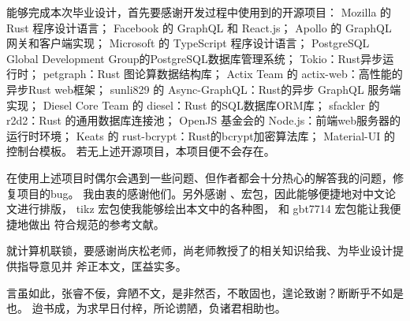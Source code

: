 \begin{arigatou}
    能够完成本次毕业设计，首先要感谢开发过程中使用到的开源项目：
    Mozilla 的 Rust 程序设计语言；
    Facebook 的 GraphQL 和 React.js；
    Apollo 的 GraphQL 网关和客户端实现；
    Microsoft 的 TypeScript 程序设计语言；
    PostgreSQL Global Development Group的PostgreSQL数据库管理系统；
    Tokio：Rust异步运行时；
    petgraph：Rust 图论算数据结构库；
    Actix Team 的 actix-web：高性能的异步Rust web框架；
    sunli829 的 Async-GraphQL：Rust的异步 GraphQL 服务端实现；
    Diesel Core Team 的 diesel：Rust 的SQL数据库ORM库；
    sfackler 的 r2d2：Rust 的通用数据库连接池；
    OpenJS 基金会的 Node.js：前端web服务器的运行时环境；
    Keats 的 rust-bcrypt：Rust的bcrypt加密算法库；
    Material-UI 的控制台模板。
    若无上述开源项目，本项目便不会存在。

    在使用上述项目时偶尔会遇到一些问题、但作者都会十分热心的解答我的问题，修复项目的bug。
    我由衷的感谢他们。另外感谢 、\CTeX 宏包，因此能够便捷地对中文论文进行排版，
    tikz 宏包使我能够绘出本文中的各种图， 和 gbt7714 宏包能让我便捷地做出
    符合规范的参考文献。

    就计算机联锁，要感谢尚庆松老师，尚老师教授了的相关知识给我、为毕业设计提供指导意见并
    斧正本文，匡益实多。

    言虽如此，张睿不佞，弇陋不文，是非然否，不敢固也，遑论致谢？断断乎不如是也。
    迨书成，为求早日付梓，所论谫陋，负诸君相助也。
\end{arigatou}